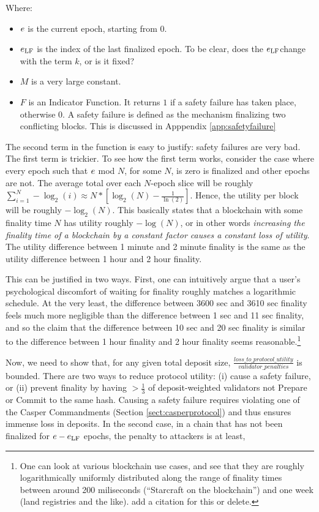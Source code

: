 \documentclass[12pt, final]{article}
\newcommand*{\todo}[1]{\color{red} #1}
\newcommand{\epoch}{\ensuremath{e}\space}
\newcommand{\epochLF}{\ensuremath{\epoch_{\textnormal{LF}}}\space}
\begin{document}
Where:

\begin{itemize}
\item $\epoch$ is the current epoch, starting from $0$.
\item $\epochLF$ is the index of the last finalized epoch. \todo{To be clear, does the \epochLF change with the term $k$, or is it fixed?}
\item $M$ is a very large constant.
\item $F$ is an Indicator Function.  It returns $1$ if a safety failure has taken place, otherwise 0. A safety failure is defined as the mechanism finalizing two conflicting blocks. This is discussed in Apppendix \ref{app:safetyfailure}
\end{itemize}

The second term in the function is easy to justify: safety failures are very bad. The first term is trickier. To see how the first term works, consider the case where every epoch such that $\epoch$ mod $N$, for some $N$, is zero is finalized and other epochs are not. The average total over each $N$-epoch slice will be roughly $\sum_{i=1}^N -\log_2(i) \approx N * \left[ \log_2(N) - \frac{1}{\ln(2)} \right]$. Hence, the utility per block will be roughly $-\log_2(N)$. This basically states that a blockchain with some finality time $N$ has utility roughly $-\log(N)$, or in other words \emph{increasing the finality time of a blockchain by a constant factor causes a constant loss of utility}. The utility difference between 1 minute and 2 minute finality is the same as the utility difference between 1 hour and 2 hour finality.

This can be justified in two ways. First, one can intuitively argue that a user's psychological discomfort of waiting for finality roughly matches a logarithmic schedule. At the very least, the difference between 3600 sec and 3610 sec finality feels much more negligible than the difference between 1 sec and 11 sec finality, and so the claim that the difference between 10 sec and 20 sec finality is similar to the difference between 1 hour finality and 2 hour finality seems reasonable.\footnote{One can look at various blockchain use cases, and see that they are roughly logarithmically uniformly distributed along the range of finality times between around 200 miliseconds (``Starcraft on the blockchain'') and one week (land registries and the like). \todo{add a citation for this or delete.}}

Now, we need to show that, for any given total deposit size, $\frac{loss\_to\_protocol\_utility}{validator\_penalties}$ is bounded. There are two ways to reduce protocol utility: (i) cause a safety failure, or (ii) prevent finality by having $> \frac{1}{3}$ of deposit-weighted validators not Prepare or Commit to the same hash.  Causing a safety failure requires violating one of the Casper Commandments (Section \ref{sect:casperprotocol}) and thus ensures immense loss in deposits.  In the second case, in a chain that has not been finalized for $\epoch - \epochLF$ epochs, the penalty to attackers is at least,
\end{document}
